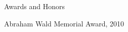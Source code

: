 \begin{vitae}
{      \begin{vitaesection}{Awards and Honors}
      \item Abraham Wald Memorial Award, 2010
        \vspace{-0.1cm}
      \end{vitaesection}
    }
  \end{vitae}
\dsp


\begin{abstract}

\end{abstract}





